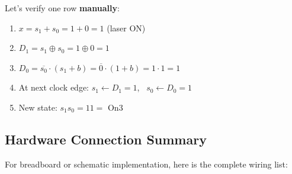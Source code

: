 \documentclass[12pt, a4paper]{article}
\begin{document}
Let's verify one row \textbf{manually}:

\begin{tip}[{Manual Trace: State = On2 ($s_1{=}1, s_0{=}0$)}]
  \begin{enumerate}
    \item $x = s_1 + s_0 = 1 + 0 = 1$ \quad \textcolor{success}{\checkmark} (laser ON)
    \item $D_1 = s_1 \oplus s_0 = 1 \oplus 0 = 1$
    \item $D_0 = \overline{s_0} \cdot (s_1 + b) = \overline{0} \cdot (1 + b) = 1 \cdot 1 = 1$
    \item At next clock edge: $s_1 \leftarrow D_1 = 1$, \ $s_0 \leftarrow D_0 = 1$
    \item New state: $s_1 s_0 = 11 =$ On3 \quad \textcolor{success}{\checkmark}
  \end{enumerate}
\end{tip}

\subsection{Hardware Connection Summary}

For breadboard or schematic implementation, here is the complete wiring list:
\end{document}
